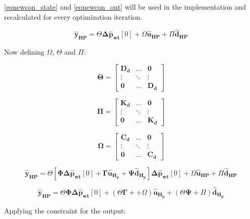 \eqref{eqnewcon_state} and \eqref{eqnewcon_out} will be used in the implementation and recalculated for every optimization iteration. 

\begin{equation}
	\bm{\hat{y}_{HP}} = \Theta \bm{\Delta \hat{p}_{wt}}[0] + \Omega \bm{\hat{u}_{HP}} + \Pi \bm{\hat{d}_{HP}}
\end{equation}

Now defining $\Omega$, $\Theta$ and $\Pi$:



\begin{equation}
    \bm{\Theta} =
 \begin{bmatrix}
 \bm{D_d} & \hdots & \bm{0} \\
 \vdots & \ddots & \vdots\\
 \bm{0} & \hdots & \bm{D_d} 
 \end{bmatrix}
 \end{equation}
  
 \begin{equation}
 \bm{\Pi} =
 \begin{bmatrix}
 \bm{K_d} & \hdots & \bm{0} \\
 \vdots & \ddots & \vdots\\
 \bm{0} & \hdots & \bm{K_d} 
 \end{bmatrix}
 \end{equation}


\begin{equation}
  \bm{\Omega} =
 \begin{bmatrix}
 \bm{C_d} & \hdots & \bm{0} \\
 \vdots & \ddots & \vdots\\
 \bm{0} & \hdots & \bm{C_d} 
 \end{bmatrix}
\end{equation}


\begin{equation}
	\bm{\hat{y}_{HP}} = \Theta [\bm{\Phi} \bm{\Delta \hat{p}_{wt}}[0] + \bm{\Gamma} \bm{\hat{u}_{H_p}} + \bm{\Psi} \bm{\hat{d}_{H_p}}] \bm{\Delta \hat{p}_{wt}}[0] + \Omega \bm{\hat{u}_{HP}} + \Pi \bm{\hat{d}_{HP}}
\end{equation}

\begin{equation}
	\bm{\hat{y}_{HP}} = \Theta \bm{\Phi} \bm{\Delta \hat{p}_{wt}}[0] +  (\Theta \bm{\Gamma}+ + \Omega) \bm{\hat{u}_{H_p}} + (\Theta \bm{\Psi} + \Pi)  \bm{\hat{d}_{H_p}}
\end{equation}

Applying the constraint for the output:

